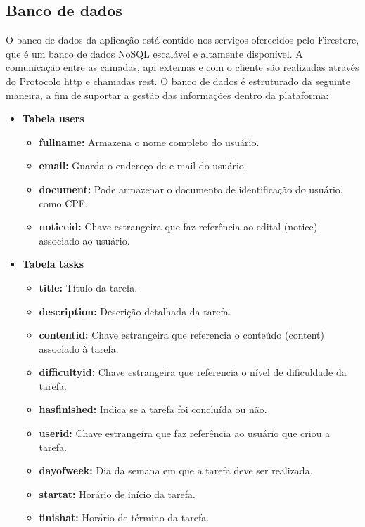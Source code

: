 \subsection{Banco de dados}
O banco de dados da aplicação está contido nos serviços oferecidos pelo Firestore, que é um banco de dados NoSQL escalável e altamente disponível. A comunicação entre as camadas, \acs{api} externas e com o cliente são realizadas através do Protocolo \ac{http} e chamadas \ac{rest}.
O banco de dados é estruturado da seguinte maneira, a fim de suportar a gestão das informações dentro da plataforma:

\begin{itemize}
    \item \textbf{Tabela users}
    
    \begin{itemize}
    \item \textbf{fullname:} Armazena o nome completo do usuário.
    \item \textbf{email:} Guarda o endereço de e-mail do usuário.
    \item \textbf{document:} Pode armazenar o documento de identificação do usuário, como CPF. 
    \item \textbf{noticeid:} Chave estrangeira que faz referência ao edital (notice) associado ao usuário.
    \end{itemize}
    
    \item \textbf{Tabela tasks}
    
    \begin{itemize}
    \item \textbf{title:} Título da tarefa.
    \item \textbf{description:} Descrição detalhada da tarefa.
    \item \textbf{contentid:} Chave estrangeira que referencia o conteúdo (content) associado à tarefa. 
    \item \textbf{difficultyid:} Chave estrangeira que referencia o nível de dificuldade da tarefa. 
    \item \textbf{hasfinished:} Indica se a tarefa foi concluída ou não.
    \item \textbf{userid:} Chave estrangeira que faz referência ao usuário que criou a tarefa. 
    \item \textbf{dayofweek:} Dia da semana em que a tarefa deve ser realizada.
    \item \textbf{startat:} Horário de início da tarefa.
    \item \textbf{finishat:} Horário de término da tarefa.
    \end{itemize}
    

\end{itemize}
